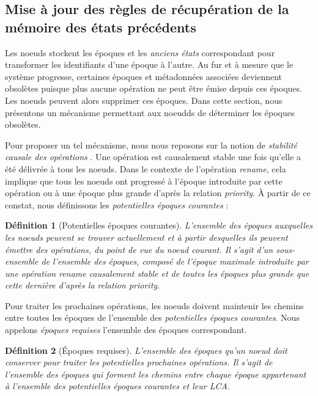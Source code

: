 \documentclass[12pt]{thesul}
\newtheorem{definition}{Définition}
\begin{document}
\subsection{Mise à jour des règles de récupération de la mémoire des états précédents}

Les noeuds stockent les époques et les \emph{anciens états} correspondant pour transformer les identifiants d'une époque à l'autre.
Au fur et à mesure que le système progresse, certaines époques et métadonnées associées deviennent obsolètes puisque plus aucune opération ne peut être émise depuis ces époques.
Les noeuds peuvent alors supprimer ces époques.
Dans cette section, nous présentons un mécanisme permettant aux noeudds de déterminer les époques obsolètes.

Pour proposer un tel mécanisme, nous nous reposons sur la notion de \emph{stabilité causale des opérations} \cite{10.1007/978-3-662-43352-2_11}.
Une opération est causalement stable une fois qu'elle a été délivrée à tous les noeuds.
Dans le contexte de l'opération \emph{rename}, cela implique que tous les noeuds ont progressé à l'époque introduite par cette opération ou à une époque plus grande d'après la relation \emph{priority}.
À partir de ce constat, nous définissons les \emph{potentielles époques courantes} :

\begin{definition}[Potentielles époques courantes]
  L'ensemble des époques auxquelles les noeuds peuvent se trouver actuellement et à partir desquelles ils peuvent émettre des opérations, du point de vue du noeud courant.
  Il s'agit d'un sous-ensemble de l'ensemble des époques, composé de l'époque maximale introduite par une opération \emph{rename} causalement stable et de toutes les époques plus grande que cette dernière d'après la relation \emph{priority}.
\end{definition}

Pour traiter les prochaines opérations, les noeuds doivent maintenir les chemins entre toutes les époques de l'ensemble des \emph{potentielles époques courantes}.
Nous appelons \emph{époques requises} l'ensemble des époques correspondant.

\begin{definition}[Époques requises]
  L'ensemble des époques qu'un noeud doit conserver pour traiter les potentielles prochaines opérations.
  Il s'agit de l'ensemble des époques qui forment les chemins entre chaque époque appartenant à l'ensemble des \emph{potentielles époques courantes} et leur \ac{LCA}.
\end{definition}
\end{document}
